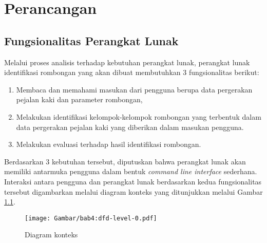 \chapter{Perancangan}
\label{chap:perancangan}

\iffalse

Sebelum melalui tahap implementasi, perangkat lunak perlu melalui proses perancangan perangkat lunak. Perancangan perangkat lunak merupakan sebuah proses untuk mengidentifikasi artefak-artefak dari perangkat lunak seperti modul, fungsi, kelas, serta artefak-artefak lainnya yang bertujuan untuk memenuhi kebutuhan perangkat lunak. Manfaat utama dari perancangan perangkat lunak adalah supaya perilaku perangkat lunak yang dihasilkan dapat lebih mudah diprediksi dan dikontrol sehingga perangkat lunak dapat lebih mudah dikembangkan dan diperbaiki di masa depan \cite{budgen:04:software-design}.

\fi

\section{Fungsionalitas Perangkat Lunak}
\label{sec:functionality}

Melalui proses analisis terhadap kebutuhan perangkat lunak, perangkat lunak identifikasi rombongan yang akan dibuat membutuhkan 3 fungsionalitas berikut:

\begin{enumerate}
    \item Membaca dan memahami masukan dari pengguna berupa data pergerakan pejalan kaki dan parameter rombongan,
    \item Melakukan identifikasi kelompok-kelompok rombongan yang terbentuk dalam data pergerakan pejalan kaki yang diberikan dalam masukan pengguna.
    \item Melakukan evaluasi terhadap hasil identifikasi rombongan.
\end{enumerate}

Berdasarkan 3 kebutuhan tersebut, diputuskan bahwa perangkat lunak akan memiliki antarmuka pengguna dalam bentuk \textit{command line interface} sederhana. Interaksi antara pengguna dan perangkat lunak berdasarkan kedua fungsionalitas tersebut digambarkan melalui diagram konteks yang ditunjukkan melalui Gambar \ref{bab4:context-diagram}.

\begin{figure}[h]
    \centering
    \texttt{[image: Gambar/bab4:dfd-level-0.pdf]}
    \caption{Diagram konteks}
    \label{bab4:context-diagram}
\end{figure}

